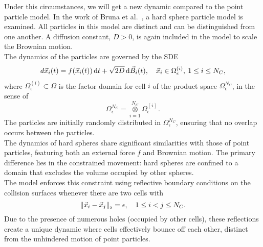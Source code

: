 Under this circumstances, we will get a new dynamic compared to the point particle model.  
In the work of Bruna et al.~\cite{Bruna2012}, a hard sphere particle model is examined.
All particles in this model are distinct and can be distinguished from one another. 
A diffusion constant, $D>0$, is again included in the model to scale the Brownian motion. \\
The dynamics of the particles are governed by the SDE
\begin{align*}
	d\vec{x}_i(t) = f(\vec{x}_i(t)) \, \mathrm{d} t + \sqrt{2D} \, \mathrm{d} \vec{B}_i(t), \quad \vec{x}_i \in \Omega_{\epsilon}^{(i)}, \: 1 \leq i \leq N_C,
\end{align*}
where $\Omega_{\epsilon}^{(i)} \subset \Omega$ is the factor domain for cell $i$ of the product space $\Omega_{\epsilon}^{N_C}$, in the sense of 
\[
	\Omega_{\epsilon}^{N_C} =  \mathop{\otimes}\limits_{i=1}^{N_C} \Omega_{\epsilon}^{(i)}. 
\]
The particles are initially randomly distributed in $\Omega^{N_C}_{\epsilon}$, ensuring that no overlap occurs between the particles. \\
The dynamics of hard spheres share significant similarities with those of point particles, featuring both an external force $f$ and Brownian motion. 
The primary difference lies in the constrained movement: hard spheres are confined to a domain that excludes the volume occupied by other spheres. \\
The model enforces this constraint using reflective boundary conditions on the collision surfaces whenever there are two cells with 
\[
	\norm[\vec{x}_i - \vec{x}_j] = \epsilon, \quad 1 \leq  i < j \leq N_C.
\]
Due to the presence of numerous holes (occupied by other cells), these reflections create a unique dynamic where cells effectively bounce off each other, distinct from the unhindered motion of point particles. \\

